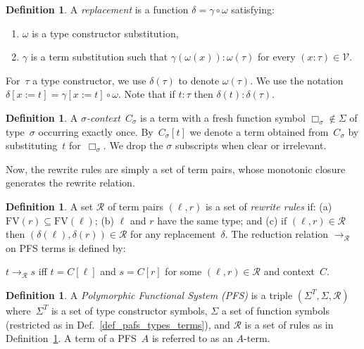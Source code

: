 \documentclass[a4paper,UKenglish,cleveref,autoref,numberwithinsect]{lipics-v2019}
\theoremstyle{definition}
\newtheorem{defn}[theorem]{Definition}
\newcommand{\Vars}{\mathcal{V}}
\newcommand{\Rules}{\mathcal{R}}
\newcommand{\subst}[2]{#1:=#2}
\newcommand{\arr}[1]{\longrightarrow_{#1}}
\newcommand{\FV}{\mathrm{FV}}
\begin{document}
\begin{defn}\label{def_replacement}
  A \emph{replacement} is a function $\delta = \gamma \circ \omega$
  satisfying:
  \begin{enumerate}
  \item $\omega$ is a type constructor substitution,
  \item $\gamma$ is a term substitution such that
    $\gamma(\omega(x)) : \omega(\tau)$ for every
    $(x : \tau) \in \Vars$.
  \end{enumerate}

  For~$\tau$ a type constructor, we use $\delta(\tau)$ to denote
  $\omega(\tau)$. We use the notation
  $\delta[\subst{x}{t}] = \gamma[\subst{x}{t}] \circ \omega$. Note
  that if $t : \tau$ then $\delta(t) : \delta(\tau)$.
\end{defn}

\begin{defn}\label{def:context}
  A \emph{$\sigma$-context}~$C_\sigma$ is a term with a fresh function
  symbol $\Box_\sigma \notin \Sigma$ of type~$\sigma$ occurring
  exactly once. By~$C_\sigma[t]$ we denote a term obtained
  from~$C_\sigma$ by substituting~$t$ for~$\Box_\sigma$. We drop the
  $\sigma$ subscripts when clear or irrelevant.
\end{defn}

Now, the rewrite rules are simply a set of term pairs, whose
monotonic closure generates the rewrite relation.

\begin{defn}\label{def_rules}
  A set $\Rules$ of term pairs $(\ell,r)$ is a set of \emph{rewrite
    rules} if: (a) $\FV(r) \subseteq \FV(\ell)$; (b) $\ell$ and $r$
  have the same type; and (c) if $(\ell,r) \in \Rules$
  then $(\delta(\ell),\delta(r)) \in \Rules$ for any
  replacement~$\delta$.  The reduction relation $\arr{\Rules}$
  on PFS terms is defined by:

\begin{center}
  $t \arr{\Rules}
  s$ iff $t = C[\ell]$ and $s = C[r]$ for some $(\ell,r)\in\Rules$ and
  context~$C$.
\end{center}
\end{defn}

\begin{defn}\label{def_pafs}
  A \emph{Polymorphic Functional System (PFS)} is a triple
  $(\Sigma^T,\Sigma,\Rules)$ where~$\Sigma^T$ is a set of type
  constructor symbols, $\Sigma$ a set of function symbols (restricted
  as in Def.~\ref{def_pafs_types_terms}), and $\Rules$ is a set
  of rules as in Definition~\ref{def_rules}. A term of a
  PFS~$A$ is referred to as an $A$-term.
\end{defn}
\end{document}
